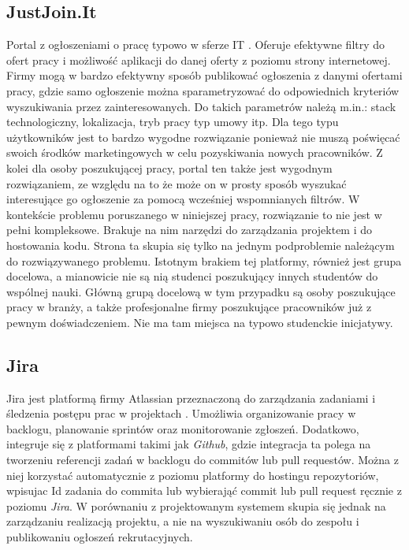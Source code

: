 
\subsection{JustJoin.It}
\label{sec:justjoin-it}
Portal z ogłoszeniami o pracę typowo w sferze IT \cite{JustJoinIt}. Oferuje efektywne filtry do ofert pracy i możliwość aplikacji do danej oferty z poziomu strony internetowej.
Firmy mogą w bardzo efektywny sposób publikować ogłoszenia z danymi ofertami pracy, gdzie samo ogłoszenie można sparametryzować do odpowiednich kryteriów wyszukiwania przez zainteresowanych.
Do takich parametrów należą m.in.: stack technologiczny, lokalizacja, tryb pracy typ umowy itp. Dla tego typu użytkowników jest to bardzo wygodne rozwiązanie ponieważ nie muszą poświęcać swoich środków marketingowych w celu
pozyskiwania nowych pracowników. Z kolei dla osoby poszukującej pracy, portal ten także jest wygodnym rozwiązaniem, ze względu na to że może on w prosty sposób wyszukać interesujące go ogłoszenie
za pomocą wcześniej wspomnianych filtrów. W kontekście problemu poruszanego w niniejszej pracy, rozwiązanie to nie jest w pełni kompleksowe.
Brakuje na nim narzędzi do zarządzania projektem i do hostowania kodu. Strona ta skupia się tylko na jednym podproblemie należącym do rozwiązywanego problemu.
Istotnym brakiem tej platformy, również jest grupa docelowa, a mianowicie nie są nią studenci poszukujący innych studentów do wspólnej nauki.
Główną grupą docelową w tym przypadku są osoby poszukujące pracy w branży, a także profesjonalne firmy poszukujące pracowników już z pewnym doświadczeniem.
Nie ma tam miejsca na typowo studenckie inicjatywy. 

\subsection{Jira}
Jira jest platformą firmy Atlassian przeznaczoną do zarządzania zadaniami i śledzenia postępu prac w projektach \cite{Jira}. Umożliwia organizowanie pracy w backlogu, planowanie sprintów oraz monitorowanie zgłoszeń.
Dodatkowo, integruje się z platformami takimi jak \textit{Github}, gdzie integracja ta polega na tworzeniu referencji zadań w backlogu do commitów lub pull requestów.
Można z niej korzystać automatycznie z poziomu platformy do hostingu repozytoriów, wpisujac Id zadania do commita lub wybierająć commit lub pull request ręcznie z poziomu \textit{Jira}.
W porównaniu z projektowanym systemem skupia się jednak na zarządzaniu realizacją projektu, a nie na wyszukiwaniu osób do zespołu i publikowaniu ogłoszeń rekrutacyjnych.


